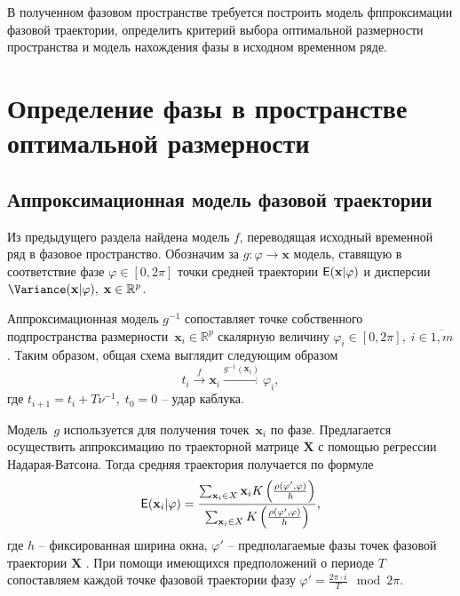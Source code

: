 \documentclass[12pt, twoside]{article}
\theoremstyle{definition}
\def\RR{\mathbb R}
\begin{document}
В полученном фазовом пространстве требуется построить модель фппроксимации фазовой траектории, определить критерий выбора оптимальной размерности пространства и модель нахождения фазы в исходном временном ряде.



\section{Определение фазы в пространстве оптимальной размерности}
\subsection{Аппроксимационная модель фазовой траектории}
Из предыдущего раздела найдена модель $f$, переводящая исходный временной ряд в фазовое пространство.   
Обозначим за $g: \varphi \rightarrow \mathbf{x}$ модель, ставящую в соответствие фазе $\varphi \in [0, 2\pi]$ точки средней траектории $\mathsf{E}(\mathbf{x}|\varphi)$ и дисперсии $\Variance(\mathbf{x}|\varphi), \; \mathbf{x}\in\RR^p$. 

Аппроксимационная модель $g^{-1}$ сопоставляет точке собственного  подпространства размерности~$\mathbf{x}_i\in\RR^p$ скалярную величину $\varphi_i\in[0,2\pi], \; i\in\overline{1, m}$. Таким образом, общая схема выглядит следующим образом
\begin{equation}\label{eq:g}
t_i \xrightarrow{f} \mathbf{x}_i \xrightarrow{g^{-1}(\mathbf{x}_i)} \varphi_i ,\end{equation}
где $ t_{i+1} = t_i + T\nu^{-1},\; t_0 = 0$ -- удар каблука.

Модель~$g$ используется для получения точек~$\mathbf{x}_i$ по фазе.
Предлагается осуществить аппроксимацию по траекторной матрице $\mathbf{X}$ с помощью регрессии Надарая-Ватсона.
Тогда средняя траектория получается по формуле
    \begin{equation}\label{eq:NW}            
    \Expect(\mathbf{x}_i|\varphi) =\frac{\sum_{\mathbf{x}_i\in X}\mathbf{x}_iK\left(\frac{\rho(\varphi', \varphi)}{h}\right)}{\sum_{\mathbf{x}_i\in X}K\left(\frac{\rho(\varphi', \varphi)}{h}\right)},  \end{equation}
где $h$ -- фиксированная ширина окна, $\varphi'$ -- предполагаемые фазы точек фазовой траектории $\mathbf{X}$ .
При помощи имеющихся предположений о периоде $T$ сопоставляем каждой точке фазовой траектории фазу $\varphi'  = \frac{2\pi \cdot i}{T} \mod 2\pi$.
\end{document}
